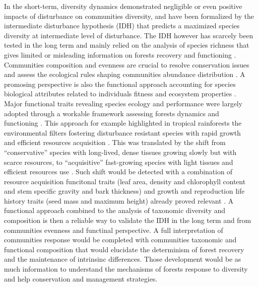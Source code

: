 \documentclass[fleqn,10pt]{ArtEcoFoG} %
\theoremstyle{definition}
\theoremstyle{definition}
\theoremstyle{definition}
\theoremstyle{remark}
\begin{document}
In the short-term, diversity dynamics demonstrated negligible or even
positive impacts of disturbance on communities diversity, and have been
formalized by the intermediate disturbance hypothesis (IDH) that
predicts a maximized species diversity at intermediate level of
disturbance\citep{Molino2001, Kariuki2006a, Berry2008a}. The IDH however
has scarcely been tested in the long term and mainly relied on the
analysis of species richness that gives limited or misleading
information on forests recovery and functioning
\citep{Martin2015, Chaudhary2016}. Communities composition and evenness
are crucial to resolve conservation issues and assess the ecological
rules shaping communities abundance distribution
\citep{Magurran1988, Lavorel2002, Bellwood2006}. A promosing perspective
is also the functional approach accounting for species biological
attributes related to individuals fitness and ecosystem properties
\citep{Violle2007b, Moretti2009, Baraloto2012a, Scheiter2013}. Major
functional traits revealing species ecology and performance were largely
adopted through a workable framework assessing forests dynamics and
functioning \citep{Diaz2005, Villeger2008a}. This approach for example
highlighted in tropical rainforests the environmental filters fostering
disturbance resistant species with rapid growth and efficient resources
acquisition \citep{Molino2001, Haddad2008}. This was translated by the
shift from ``conservative'' species with long-lived, dense tissues
growing slowly but with scarce resources, to ``acquisitive''
fast-growing species with light tissues and efficient resources use
\citep{TerSteege2001, Reich2014, Herault2011}. Such shift would be
detected with a combination of resource acquisition funcitonal traits
(leaf area, density and chlorophyll content and stem specific gravity
and bark thickness) and growth and reproduction life history traits
(seed mass and maximum height) already proved relevant
\citep{Wright2004, Westoby2006a, Chave2009b}. A functional approach
combined to the analysis of taxonomic diversity and composition is then
a reliable way to validate the IDH in the long term and from communities
evenness and functinal perspective. A full interpretation of communities
response would be completed with communities taxonomic and functional
composition that would elucidate the determinism of forest recovery and
the maintenance of intrinsinc differences. Those development would be as
much information to understand the mechanisms of forests response to
diversity and help conservation and management strategies.
\end{document}
